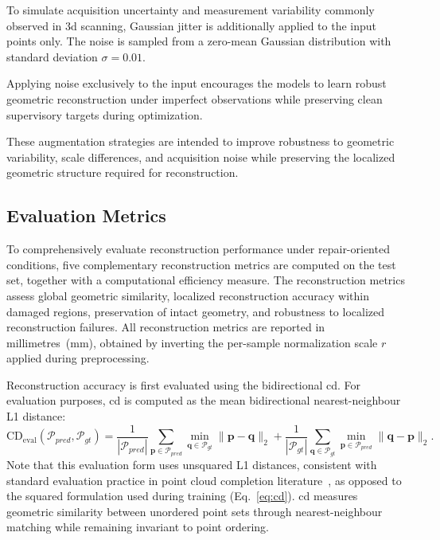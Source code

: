 To simulate acquisition uncertainty and measurement variability commonly observed in \ac{3d} scanning, Gaussian jitter is additionally applied to the input points only. The noise is sampled from a zero-mean Gaussian distribution with standard deviation $\sigma = 0.01$.

Applying noise exclusively to the input encourages the models to learn robust geometric reconstruction under imperfect observations while preserving clean supervisory targets during optimization.

These augmentation strategies are intended to improve robustness to geometric variability, scale differences, and acquisition noise while preserving the localized geometric structure required for reconstruction.

\subsection{Evaluation Metrics}
\label{sec:metrics}

To comprehensively evaluate reconstruction performance under repair-oriented conditions, five complementary reconstruction metrics are computed on the test set, together with a computational efficiency measure. The reconstruction metrics assess global geometric similarity, localized reconstruction accuracy within damaged regions, preservation of intact geometry, and robustness to localized reconstruction failures. All reconstruction metrics are reported in millimetres~(mm), obtained by inverting the per-sample normalization scale $r$ applied during preprocessing.

Reconstruction accuracy is first evaluated using the bidirectional \ac{cd}. For evaluation purposes, \ac{cd} is computed as the mean bidirectional nearest-neighbour L1 distance:
\begin{equation}
\text{CD}_{\text{eval}}(\mathcal{P}_{pred}, \mathcal{P}_{gt}) =
\frac{1}{|\mathcal{P}_{pred}|}
\sum_{\mathbf{p} \in \mathcal{P}_{pred}}
\min_{\mathbf{q} \in \mathcal{P}_{gt}}
\|\mathbf{p} - \mathbf{q}\|_2
+
\frac{1}{|\mathcal{P}_{gt}|}
\sum_{\mathbf{q} \in \mathcal{P}_{gt}}
\min_{\mathbf{p} \in \mathcal{P}_{pred}}
\|\mathbf{q} - \mathbf{p}\|_2.
\label{eq:cd_eval}
\end{equation}
Note that this evaluation form uses unsquared L1 distances, consistent with standard evaluation practice in point cloud completion literature~\cite{Yuan2019}, as opposed to the squared formulation used during training (Eq.~\ref{eq:cd}). \ac{cd} measures geometric similarity between unordered point sets through nearest-neighbour matching while remaining invariant to point ordering. 

